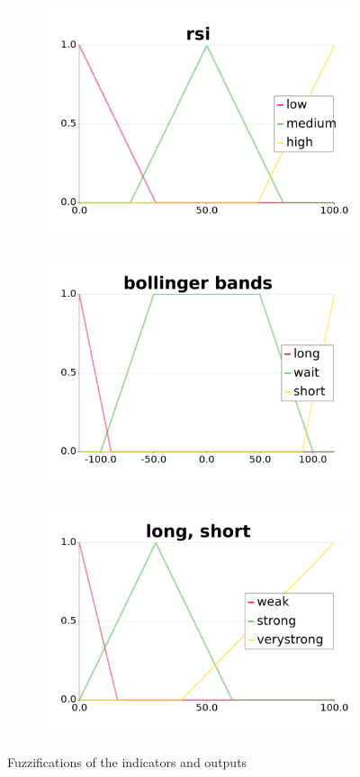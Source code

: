 \documentclass{article}
\begin{document}
\begin{figure}[ht]
    \begin{subfigure}{.45\textwidth}
        \centering
        \includegraphics[width = \linewidth]{rsi.png}
    \end{subfigure}
    \begin{subfigure}{.45\textwidth}
        \centering
        \includegraphics[width = \linewidth]{bb.png}
    \end{subfigure}
    \begin{subfigure}{\textwidth}
        \centering
        \includegraphics[width = 0.5\linewidth]{ls.png}
    \end{subfigure}

    \caption{Fuzzifications of the indicators and outputs}
    \label{fig:1}
\end{figure}
\end{document}
